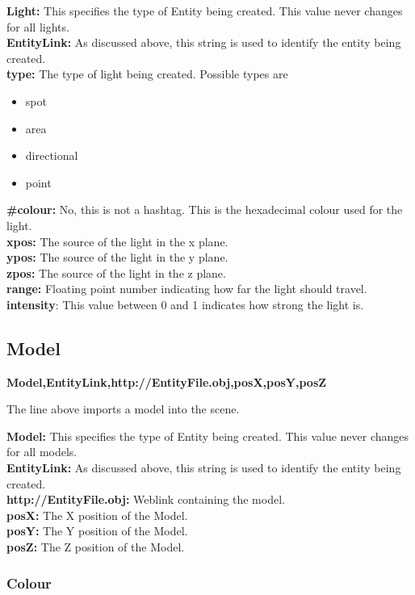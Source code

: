 \documentclass[a4paper,12pt]{article}
\begin{document}
\textbf{Light:} This specifies the type of Entity being created. This value never changes for all lights.\\
\textbf{EntityLink:} As discussed above, this string is used to identify the entity being created.\\
\textbf{type:} The type of light being created. Possible types are
\begin{itemize}
\item spot
\item area
\item directional
\item point
\end{itemize}
\textbf{\#colour:} No, this is not a hashtag. This is the hexadecimal colour used for the light.\\
\textbf{xpos:} The source of the light in the x plane.\\
\textbf{ypos:} The source of the light in the y plane.\\
\textbf{zpos:} The source of the light in the z plane.\\
\textbf{range:} Floating point number indicating how far the light should travel.\\
\textbf{intensity}: This value between 0 and 1 indicates how strong the light is.

\subsection{Model}

\textbf{Model,EntityLink,http://EntityFile.obj,posX,posY,posZ}

The line above imports a model into the scene.

\textbf{Model:} This specifies the type of Entity being created. This value never changes for all models.\\
\textbf{EntityLink:} As discussed above, this string is used to identify the entity being created.\\
\textbf{http://EntityFile.obj:} Weblink containing the model.\\
\textbf{posX:} The X position of the Model.\\
\textbf{posY:} The Y position of the Model.\\
\textbf{posZ:} The Z position of the Model.\\

\subsubsection{Colour}
\end{document}
